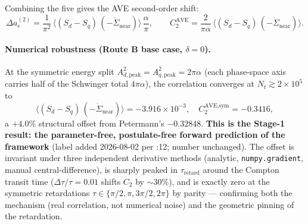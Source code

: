 \noindent Combining the five gives the AVE second-order shift:
\begin{equation}
    \Delta a_e^{(2)}
    = \frac{1}{\pi^2}\,\langle (S_d - S_q)\,(-\dot{\Sigma}_{\text{near}})\rangle\,\frac{\alpha}{\pi},
    \qquad
    C_2^{\text{AVE}}
    = \frac{2}{\pi\alpha}\,\langle (S_d - S_q)\,(-\dot{\Sigma}_{\text{near}})\rangle.
\end{equation}

\paragraph{Numerical robustness (Route B base case, $\delta = 0$).}
At the symmetric energy split $A_{d,\text{peak}}^2 =
A_{q,\text{peak}}^2 = 2\pi\alpha$ (each phase-space axis carries half
of the Schwinger total $4\pi\alpha$), the correlation converges at
$N_t \gtrsim 2\times 10^5$ to
\[
    \langle (S_d - S_q)\,(-\dot{\Sigma}_{\text{near}})\rangle = -3.916\times 10^{-3},
    \quad
    C_2^{\text{AVE,sym}} = -0.3416,
\]
a $+4.0\%$ structural offset from Petermann's $-0.32848$. \textbf{This is the Stage-1 result: the
parameter-free, postulate-free forward prediction of the framework} (label added 2026-08-02 per
:12; number unchanged). The offset
is invariant under three independent derivative methods (analytic,
\texttt{numpy.gradient}, manual central-difference), is sharply peaked
in $\tau_{\text{retard}}$ around the Compton transit time
($\Delta\tau/\tau = 0.01$ shifts $C_2$ by $\sim 30\%$), and is exactly
zero at the symmetric retardations $\tau \in \{\pi/2, \pi, 3\pi/2,
2\pi\}$ by parity --- confirming both the mechanism (real correlation,
not numerical noise) and the geometric pinning of the retardation.

